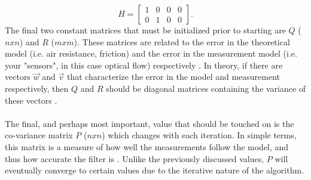 \documentclass[12pt]{article} %
\begin{document}
\begin{equation}
H = \begin{bmatrix}
1 & 0 & 0 & 0 \\
0 & 1 & 0 & 0 
\end{bmatrix}.
\end{equation}
The final two constant matrices that must be initialized prior to starting are $Q$ ($nxn$) and $R$ ($mxm$). These matrices are related to the error in the theoretical model (i.e. air resistance, friction) and the error in the measurement model (i.e. your "sensors", in this case optical flow) respectively \cite{12}. In theory, if there are vectors $\vec{w}$ and $\vec{v}$ that characterize the error in the model and measurement respectively, then $Q$ and $R$ should be diagonal matrices containing the variance of these vectors \cite{4}. \\\\
The final, and perhaps most important, value that should be touched on is the co-variance matrix $P$ ($nxn$) which changes with each iteration. In simple terms, this matrix is a measure of how well the measurements follow the model, and thus how accurate the filter is \cite{12}. Unlike the previously discussed values, $P$ will eventually converge to certain values due to the iterative nature of the algorithm.
\end{document}

